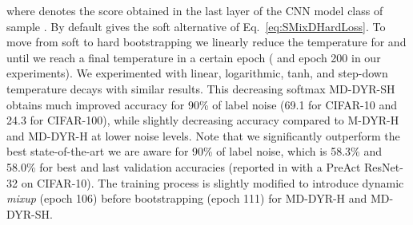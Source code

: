 \documentclass{article}
\begin{document}
where  denotes the score obtained
in the last layer of the CNN model class  of sample . By default
 gives the soft alternative of Eq.~\eqref{eq:SMixDHardLoss}.
To move from soft to hard bootstrapping we linearly
reduce the temperature for 
and  until we reach a final temperature in a certain
epoch ( and epoch 200 in our experiments). We experimented
with linear, logarithmic, tanh, and step-down temperature decays with
similar results. This decreasing softmax MD-DYR-SH obtains
much improved accuracy for 90\% of label noise (69.1 for CIFAR-10 and
24.3 for CIFAR-100), while slightly decreasing accuracy compared
to M-DYR-H and MD-DYR-H at lower noise levels. Note that we significantly
outperform the best state-of-the-art we are aware for 90\% of label
noise, which is 58.3\% and 58.0\% for best and last validation accuracies (reported in \cite{2018_CVPR_JointOpt} with a PreAct ResNet-32 on CIFAR-10). The training process is slightly modified to introduce dynamic \emph{mixup} (epoch 106) before  bootstrapping (epoch 111) for MD-DYR-H and MD-DYR-SH.
\end{document}
